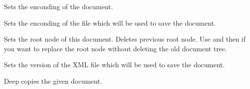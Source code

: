 Sets the enconding of the document.


\label{wxxmldocumentsetfileencoding}


Sets the enconding of the file which will be used to save the document.


\label{wxxmldocumentsetroot}


Sets the root node of this document. Deletes previous root node.
Use  and then 
 if you want
to replace the root node without deleting the old document tree.


\label{wxxmldocumentsetversion}


Sets the version of the XML file which will be used to save the document.


\label{wxxmldocumentoperatorassign}


Deep copies the given document.

